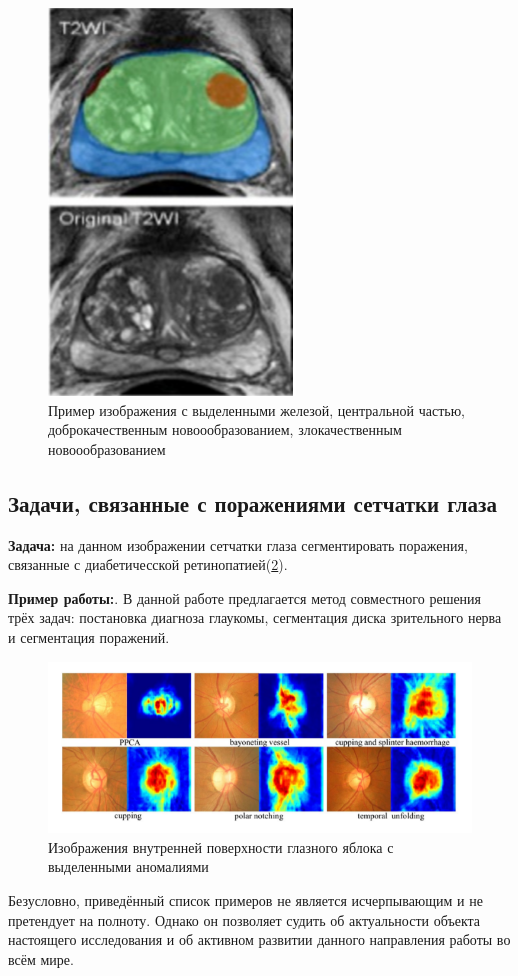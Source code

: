 \begin{figure}[h] 
  \center
  \includegraphics [scale=0.8] {images/prostate.png}
  \caption{ Пример изображения с выделенными {\color{blue} железой}, {\color{green} центральной частью}, {\color{orange} доброкачественным новоообразованием}, {\color{red} злокачественным новоообразованием} \cite{prostate-cancer} } 
  \label{fig:prostate}  
\end{figure}



\subsection{Задачи, связанные с поражениями сетчатки глаза}

{\bf Задача:} на данном изображении сетчатки глаза сегментировать поражения, связанные с диабетичесской ретинопатией(\ref{fig:retina}).

{\bf Пример работы:}\cite{retinopathy}. В данной работе предлагается метод совместного решения трёх задач: постановка диагноза глаукомы, сегментация диска зрительного нерва и сегментация поражений.

\begin{figure}[h] 
  \center
  \includegraphics [scale=0.8] {images/glaucoma.png}
  \caption{ Изображения внутренней поверхности глазного яблока с выделенными аномалиями} 
  \label{fig:retina}  
\end{figure}


Безусловно, приведённый список примеров не является исчерпывающим и не претендует на полноту. Однако он позволяет судить об актуальности объекта настоящего исследования и об активном развитии данного направления работы во всём мире.

